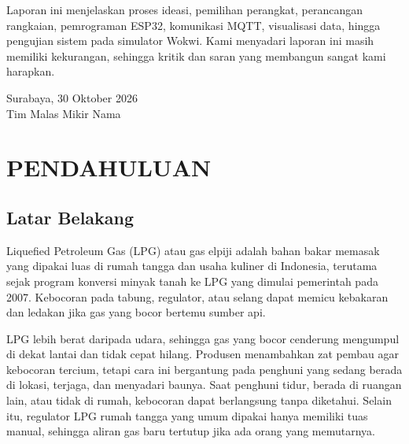 \documentclass[12pt,a4paper,oneside]{report}
\begin{document}
Laporan ini menjelaskan proses ideasi, pemilihan perangkat, perancangan rangkaian, pemrograman ESP32, komunikasi MQTT, visualisasi data, hingga pengujian sistem pada simulator Wokwi. Kami menyadari laporan ini masih memiliki kekurangan, sehingga kritik dan saran yang membangun sangat kami harapkan.

\vspace{1cm}
\begin{flushright}
Surabaya, 30 Oktober 2026\\[1.5cm]
Tim Malas Mikir Nama
\end{flushright}

\cleardoublepage{}
\tableofcontents
\cleardoublepage{}
\listoffigures
\cleardoublepage{}
\listoftables

\cleardoublepage
{}

\chapter{PENDAHULUAN}

\section{Latar Belakang}
Liquefied Petroleum Gas (LPG) atau gas elpiji adalah bahan bakar memasak yang dipakai luas di rumah tangga dan usaha kuliner di Indonesia, terutama sejak program konversi minyak tanah ke LPG yang dimulai pemerintah pada 2007. Kebocoran pada tabung, regulator, atau selang dapat memicu kebakaran dan ledakan jika gas yang bocor bertemu sumber api.

LPG lebih berat daripada udara, sehingga gas yang bocor cenderung mengumpul di dekat lantai dan tidak cepat hilang. Produsen menambahkan zat pembau agar kebocoran tercium, tetapi cara ini bergantung pada penghuni yang sedang berada di lokasi, terjaga, dan menyadari baunya. Saat penghuni tidur, berada di ruangan lain, atau tidak di rumah, kebocoran dapat berlangsung tanpa diketahui. Selain itu, regulator LPG rumah tangga yang umum dipakai hanya memiliki tuas manual, sehingga aliran gas baru tertutup jika ada orang yang memutarnya.
\end{document}
